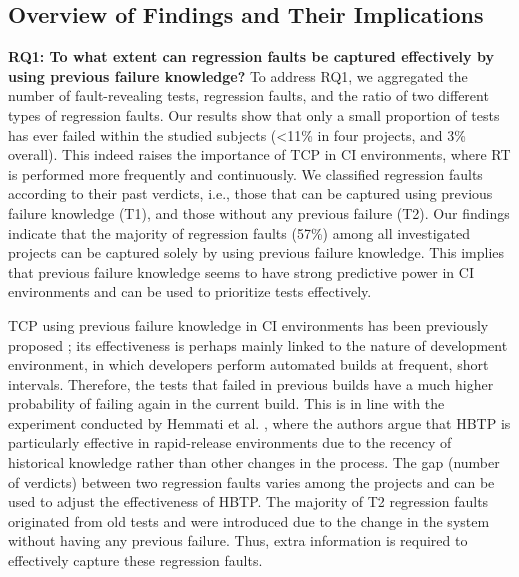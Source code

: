 \documentclass[1p]{elsarticle}
\begin{document}
\subsection{Overview of Findings and Their Implications}


\textbf{RQ1: To what extent can regression faults be captured effectively by using previous failure knowledge?} To address RQ1, we aggregated the number of fault-revealing tests, regression faults, and the ratio of two different types of regression faults. Our results show that only a small proportion of tests has ever failed within the studied subjects (\textless 11\% in four projects, and 3\% overall). This indeed raises the importance of TCP in CI environments, where RT is performed more frequently and continuously. We classified regression faults according to their past verdicts, i.e., those that can be captured using previous failure knowledge (T1), and those without any previous failure (T2). Our findings indicate that the majority of regression faults (57\%) among all investigated projects can be captured solely by using previous failure knowledge. This implies that previous failure knowledge seems to have strong predictive power in CI environments and can be used to prioritize tests effectively. 

TCP using previous failure knowledge in CI environments has been previously proposed \cite{hemmati2017prioritizing,elbaum2014techniques,marijan2013test,srikanth2016test,kim2002history,strandberg2016experience}; its effectiveness is perhaps mainly linked to the nature of development environment, in which developers perform automated builds at frequent, short intervals. Therefore, the tests that failed in previous builds have a much higher probability of failing again in the current build. This is in line with the experiment conducted by Hemmati et al. \cite{hemmati2017prioritizing}, where the authors argue that HBTP is particularly effective in rapid-release environments due to the recency of historical knowledge rather than other changes in the process. The gap (number of verdicts) between two regression faults varies among the projects and can be used to adjust the effectiveness of HBTP. The majority of T2 regression faults originated from old tests and were introduced due to the change in the system without having any previous failure. Thus, extra information is required to effectively capture these regression faults.
\end{document}
